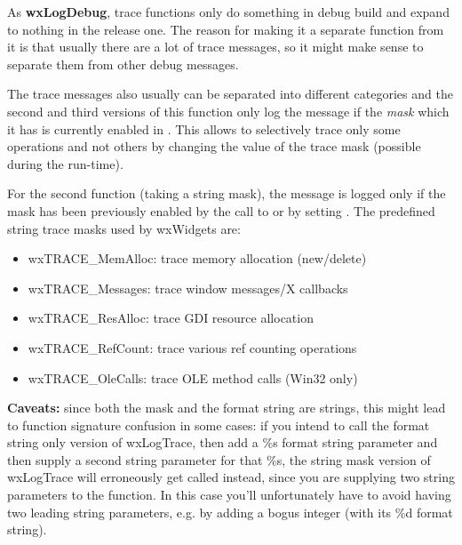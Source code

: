 

As {\bf wxLogDebug}, trace functions only do something in debug build and
expand to nothing in the release one. The reason for making
it a separate function from it is that usually there are a lot of trace
messages, so it might make sense to separate them from other debug messages.

The trace messages also usually can be separated into different categories and
the second and third versions of this function only log the message if the
{\it mask} which it has is currently enabled in . This
allows to selectively trace only some operations and not others by changing
the value of the trace mask (possible during the run-time).

For the second function (taking a string mask), the message is logged only if
the mask has been previously enabled by the call to
 or by setting
.
The predefined string trace masks
used by wxWidgets are:

\begin{itemize}\itemsep=0pt
\item wxTRACE\_MemAlloc: trace memory allocation (new/delete)
\item wxTRACE\_Messages: trace window messages/X callbacks
\item wxTRACE\_ResAlloc: trace GDI resource allocation
\item wxTRACE\_RefCount: trace various ref counting operations
\item wxTRACE\_OleCalls: trace OLE method calls (Win32 only)
\end{itemize}

{\bf Caveats:} since both the mask and the format string are strings,
this might lead to function signature confusion in some cases:
if you intend to call the format string only version of wxLogTrace,
then add a \%s format string parameter and then supply a second string parameter for that \%s, the string mask version of wxLogTrace will erroneously get called instead, since you are supplying two string parameters to the function.
In this case you'll unfortunately have to avoid having two leading
string parameters, e.g. by adding a bogus integer (with its \%d format string).

